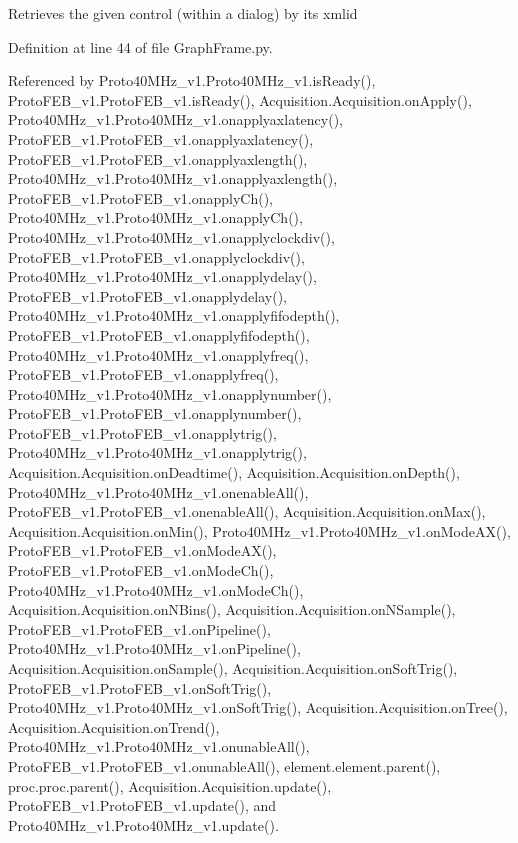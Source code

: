 \begin{DoxyVerb}Retrieves the given control (within a dialog) by its xmlid\end{DoxyVerb}
 

Definition at line 44 of file Graph\+Frame.\+py.



Referenced by Proto40\+M\+Hz\+\_\+v1.\+Proto40\+M\+Hz\+\_\+v1.\+is\+Ready(), Proto\+F\+E\+B\+\_\+v1.\+Proto\+F\+E\+B\+\_\+v1.\+is\+Ready(), Acquisition.\+Acquisition.\+on\+Apply(), Proto40\+M\+Hz\+\_\+v1.\+Proto40\+M\+Hz\+\_\+v1.\+onapplyaxlatency(), Proto\+F\+E\+B\+\_\+v1.\+Proto\+F\+E\+B\+\_\+v1.\+onapplyaxlatency(), Proto\+F\+E\+B\+\_\+v1.\+Proto\+F\+E\+B\+\_\+v1.\+onapplyaxlength(), Proto40\+M\+Hz\+\_\+v1.\+Proto40\+M\+Hz\+\_\+v1.\+onapplyaxlength(), Proto\+F\+E\+B\+\_\+v1.\+Proto\+F\+E\+B\+\_\+v1.\+onapply\+Ch(), Proto40\+M\+Hz\+\_\+v1.\+Proto40\+M\+Hz\+\_\+v1.\+onapply\+Ch(), Proto40\+M\+Hz\+\_\+v1.\+Proto40\+M\+Hz\+\_\+v1.\+onapplyclockdiv(), Proto\+F\+E\+B\+\_\+v1.\+Proto\+F\+E\+B\+\_\+v1.\+onapplyclockdiv(), Proto40\+M\+Hz\+\_\+v1.\+Proto40\+M\+Hz\+\_\+v1.\+onapplydelay(), Proto\+F\+E\+B\+\_\+v1.\+Proto\+F\+E\+B\+\_\+v1.\+onapplydelay(), Proto40\+M\+Hz\+\_\+v1.\+Proto40\+M\+Hz\+\_\+v1.\+onapplyfifodepth(), Proto\+F\+E\+B\+\_\+v1.\+Proto\+F\+E\+B\+\_\+v1.\+onapplyfifodepth(), Proto40\+M\+Hz\+\_\+v1.\+Proto40\+M\+Hz\+\_\+v1.\+onapplyfreq(), Proto\+F\+E\+B\+\_\+v1.\+Proto\+F\+E\+B\+\_\+v1.\+onapplyfreq(), Proto40\+M\+Hz\+\_\+v1.\+Proto40\+M\+Hz\+\_\+v1.\+onapplynumber(), Proto\+F\+E\+B\+\_\+v1.\+Proto\+F\+E\+B\+\_\+v1.\+onapplynumber(), Proto\+F\+E\+B\+\_\+v1.\+Proto\+F\+E\+B\+\_\+v1.\+onapplytrig(), Proto40\+M\+Hz\+\_\+v1.\+Proto40\+M\+Hz\+\_\+v1.\+onapplytrig(), Acquisition.\+Acquisition.\+on\+Deadtime(), Acquisition.\+Acquisition.\+on\+Depth(), Proto40\+M\+Hz\+\_\+v1.\+Proto40\+M\+Hz\+\_\+v1.\+onenable\+All(), Proto\+F\+E\+B\+\_\+v1.\+Proto\+F\+E\+B\+\_\+v1.\+onenable\+All(), Acquisition.\+Acquisition.\+on\+Max(), Acquisition.\+Acquisition.\+on\+Min(), Proto40\+M\+Hz\+\_\+v1.\+Proto40\+M\+Hz\+\_\+v1.\+on\+Mode\+A\+X(), Proto\+F\+E\+B\+\_\+v1.\+Proto\+F\+E\+B\+\_\+v1.\+on\+Mode\+A\+X(), Proto\+F\+E\+B\+\_\+v1.\+Proto\+F\+E\+B\+\_\+v1.\+on\+Mode\+Ch(), Proto40\+M\+Hz\+\_\+v1.\+Proto40\+M\+Hz\+\_\+v1.\+on\+Mode\+Ch(), Acquisition.\+Acquisition.\+on\+N\+Bins(), Acquisition.\+Acquisition.\+on\+N\+Sample(), Proto\+F\+E\+B\+\_\+v1.\+Proto\+F\+E\+B\+\_\+v1.\+on\+Pipeline(), Proto40\+M\+Hz\+\_\+v1.\+Proto40\+M\+Hz\+\_\+v1.\+on\+Pipeline(), Acquisition.\+Acquisition.\+on\+Sample(), Acquisition.\+Acquisition.\+on\+Soft\+Trig(), Proto\+F\+E\+B\+\_\+v1.\+Proto\+F\+E\+B\+\_\+v1.\+on\+Soft\+Trig(), Proto40\+M\+Hz\+\_\+v1.\+Proto40\+M\+Hz\+\_\+v1.\+on\+Soft\+Trig(), Acquisition.\+Acquisition.\+on\+Tree(), Acquisition.\+Acquisition.\+on\+Trend(), Proto40\+M\+Hz\+\_\+v1.\+Proto40\+M\+Hz\+\_\+v1.\+onunable\+All(), Proto\+F\+E\+B\+\_\+v1.\+Proto\+F\+E\+B\+\_\+v1.\+onunable\+All(), element.\+element.\+parent(), proc.\+proc.\+parent(), Acquisition.\+Acquisition.\+update(), Proto\+F\+E\+B\+\_\+v1.\+Proto\+F\+E\+B\+\_\+v1.\+update(), and Proto40\+M\+Hz\+\_\+v1.\+Proto40\+M\+Hz\+\_\+v1.\+update().


